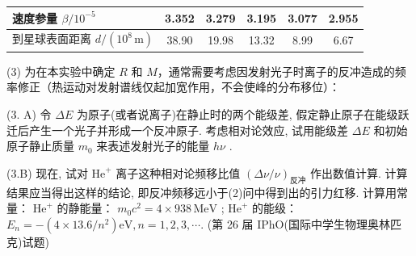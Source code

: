 \begin{center}
\begin{tabular}{|l|c|c|c|c|c|}
\hline
速度参量 $\beta/10^{-5}$ & 3.352 & 3.279 & 3.195 & 3.077 & 2.955 \\ \hline
到星球表面距离 $d/(10^{8}\,\mathrm m)$ & 38.90 & 19.98 & 13.32 & 8.99 & 6.67 \\ \hline
\end{tabular}
\end{center}

(3) 为在本实验中确定 $R$ 和 $M$，通常需要考虑因发射光子时离子的反冲造成的频率修正（热运动对发射谱线仅起加宽作用，不会使峰的分布移位）：

(3. A) 令 $\Delta E$ 为原子(或者说离子)在静止时的两个能级差, 假定静止原子在能级跃迁后产生一个光子并形成一个反冲原子. 考虑相对论效应, 试用能级差 $\Delta E$ 和初始原子静止质量 $m_0$ 来表述发射光子的能量 $h\nu$ .

(3.B) 现在, 试对 $\mathrm{He}^{+}$ 离子这种相对论频移比值 $(\Delta \nu / \nu)_{\text{反冲}}$ 作出数值计算. 计算结果应当得出这样的结论, 即反冲频移远小于(2)问中得到出的引力红移.
计算用常量：
$\mathrm{He}^{+}$ 的静能量： $m_{0}c^{2}=4\times938\,\mathrm{MeV}$ ;
$\mathrm{He}^{+}$ 的能级： $E_{n}=-(4\times13.6/n^{2})\mathrm{eV}, n=1,2,3,\cdots.$
(第 26 届 IPhO(国际中学生物理奥林匹克)试题)
